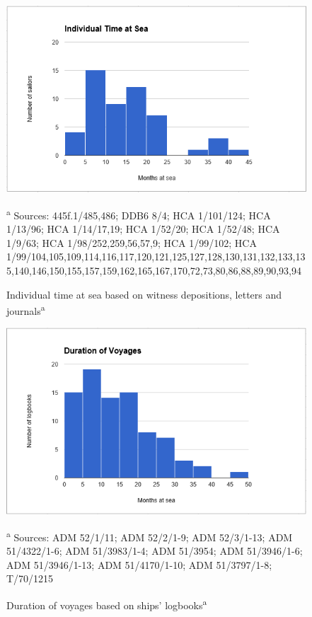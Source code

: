 \begin{figure}
  

\includegraphics[width=\textwidth]{figures/delgado-img9.png}
 

\caption{\label{fig:key:4.2} Individual time at sea based on witness depositions, letters and journals\textsuperscript{a} }

\textsuperscript{a} Sources: 445f.1/485,486; DDB6 8/4; HCA 1/101/124; HCA 1/13/96; HCA 1/14/17,19; HCA 1/52/20; HCA 1/52/48; HCA 1/9/63; HCA 1/98/252,259,56,57,9; HCA 1/99/102; HCA 1/99/104,105,109,114,116,117,120,121,125,127,128,130,131,132,133,135,140,146,150,155,157,159,162,165,167,170,72,73,80,86,88,89,90,93,94
\end{figure}


\begin{figure}
  

\includegraphics[width=\textwidth]{figures/delgado-img10.png}
 

\caption{\label{fig:key:4.3} Duration of voyages based on ships’ logbooks\textsuperscript{a}}

\textsuperscript{a} Sources: ADM 52/1/11; ADM 52/2/1-9; ADM 52/3/1-13; ADM 51/4322/1-6; ADM 51/3983/1-4; ADM 51/3954; ADM 51/3946/1-6; ADM 51/3946/1-13; ADM 51/4170/1-10; ADM 51/3797/1-8; T/70/1215
\end{figure}


